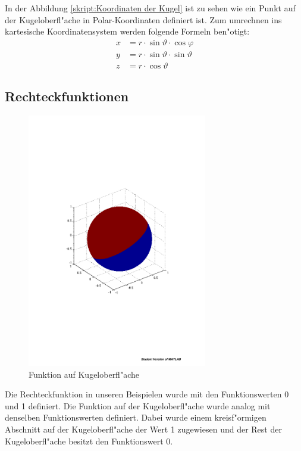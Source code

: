 \begin{refsection}
In der Abbildung \ref{skript:Koordinaten der Kugel} 
ist zu sehen wie ein Punkt auf der Kugeloberfl"ache in 
Polar-Koordinaten definiert ist. 
Zum umrechnen ins kartesische Koordinatensystem werden folgende 
Formeln ben"otigt:
\begin{align*}
x& = r \cdot \sin\vartheta \cdot \cos\varphi 
\\
y& = r \cdot \sin\vartheta \cdot \sin\vartheta
\\
z& = r \cdot \cos\vartheta 
\end{align*}

\subsection{Rechteckfunktionen}
\begin{figure}%
\centering
\includegraphics[width=0.7\textwidth]{kugel/Funktion.pdf}
\caption{Funktion auf Kugeloberfl"ache
\label{skript:Funktion auf Kugeloberfl"ache}}
\end{figure}
Die Rechteckfunktion in unseren Beispielen wurde mit den 
Funktionswerten 0 und 1 definiert. 
Die Funktion auf der Kugeloberfl"ache wurde analog 
mit denselben Funktionswerten definiert. 
Dabei wurde einem kreisf"ormigen Abschnitt auf der Kugeloberfl"ache 
der Wert 1 zugewiesen und der Rest der Kugeloberfl"ache besitzt den 
Funktionswert 0. 


\end{refsection}
